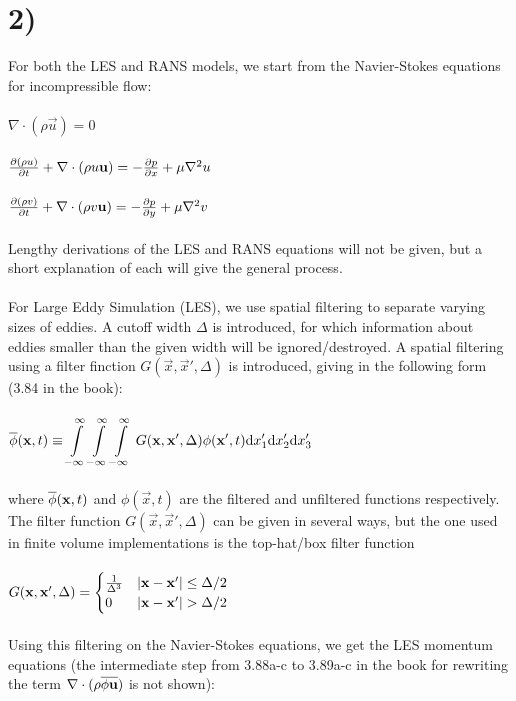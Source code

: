 \documentclass[a4paper,english,12pt,twoside]{article}
\begin{document}
\section*{2)}
For both the LES and RANS models, we start from the Navier-Stokes equations for incompressible flow:\\
\\
$\nabla\cdot (\rho\vec{u}) = 0$\\
\\
$\frac{\partial (\rho u)}{\partial t} + \nabla\cdot(\rho u \mathbf{u}) = -\frac{\partial p}{\partial x} + \mu\nabla^2u$\\
\\
$\frac{\partial (\rho v)}{\partial t} + \nabla\cdot(\rho v \mathbf{u}) = -\frac{\partial p}{\partial y} + \mu\nabla^2v$\\
\\
Lengthy derivations of the LES and RANS equations will not be given, but a short explanation of each will give the general process.\\
\\
For Large Eddy Simulation (LES), we use spatial filtering to separate varying sizes of eddies. A cutoff width $\Delta$ is introduced, for which information about eddies smaller than the given width will be ignored/destroyed. A spatial filtering using a filter finction $G(\vec{x},\vec{x}', \Delta)$ is introduced, giving in the following form (3.84 in the book):\\
\\
$\overline{\phi}(\mathbf{x},t) \equiv \displaystyle\int\limits_{-\infty}^\infty\int\limits_{-\infty}^\infty\int\limits_{-\infty}^\infty\, G(\mathbf{x},\mathbf{x}', \Delta)\phi(\mathbf{x}', t)\mathrm dx_1'\mathrm dx_2'\mathrm dx_3'$\\
\\
where $\overline{\phi}(\mathbf{x},t)$ and $\phi(\vec{x}, t)$ are the filtered and unfiltered functions respectively. The filter function $G(\vec{x},\vec{x}', \Delta)$ can be given in several ways, but the one used in finite volume implementations is the top-hat/box filter function\\
\\
$
 G(\mathbf{x},\mathbf{x}', \Delta) = 
  \begin{cases} 
   \frac{1}{\Delta^3} & \left|\mathbf{x} - \mathbf{x}'\right| \leq \Delta / 2 \\
   0       & \left|\mathbf{x} - \mathbf{x}'\right| > \Delta / 2
  \end{cases}
$\\
\\
Using this filtering on the Navier-Stokes equations, we get the LES momentum equations (the intermediate step from 3.88a-c to 3.89a-c in the book for rewriting the term $\nabla\cdot(\rho\overline{\phi\mathbf{u}})$ is not shown):\\
\end{document}
